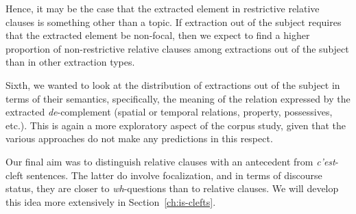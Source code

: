 \begin{exe}
\ex \citep[181]{Song.2017}
\begin{xlist}
\end{xlist}
\end{exe}

\begin{sloppypar}
Hence, it may be the case that the extracted element in restrictive relative clauses is something other than a topic. If extraction out of the subject requires that the extracted element be non-focal, then we expect to find a higher proportion of non-restrictive relative clauses among extractions out of the subject than in other extraction types. 
\end{sloppypar}

Sixth, we wanted to look at the distribution of extractions out of the subject in terms of their semantics, specifically, the meaning of the relation expressed by the extracted \textit{de}-complement (spatial or temporal relations, property, possessives, etc.). This is again a more exploratory aspect of the corpus study, given that the various approaches do not make any predictions in this respect.

Our final aim was to distinguish relative clauses with an antecedent from \emph{c'est}-cleft sentences. The latter do involve focalization, and in terms of discourse status, they are closer to \textit{wh}-questions than to relative clauses. We will develop this idea more extensively in Section~\ref{ch:is-clefts}. 

